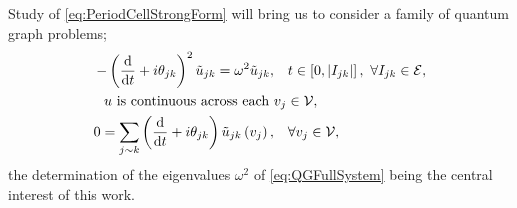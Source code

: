 Study of \eqref{eq:PeriodCellStrongForm} will bring us to consider a family of quantum graph problems;
\begin{subequations} \label{eq:QGFullSystem}
	\begin{align}
		-\left( \dfrac{\mathrm{d}}{\mathrm{d}t} + i\theta_{jk} \right)^2 \tilde{u}_{jk} = \omega^2 \tilde{u}_{jk}, &\quad t\in\left[ 0,\left\lvert I_{jk} \right\rvert \right], \ \forall I_{jk}\in \mathcal{E}, \label{eq:QGEdgeODEs} \\
		u \text{ is continuous across each } &v_j \in \mathcal{V}, \label{eq:QGVertCty }\\
		0 = \sum_{j\sim k}\left( \dfrac{\mathrm{d}}{\mathrm{d}t} + i\theta_{jk} \right)\tilde{u}_{jk}\left( v_j \right), &\quad \forall v_j \in \mathcal{V}, \label{eq:QGDerivCondition}
	\end{align}
\end{subequations}
the determination of the eigenvalues $\omega^2$ of \eqref{eq:QGFullSystem} being the central interest of this work.